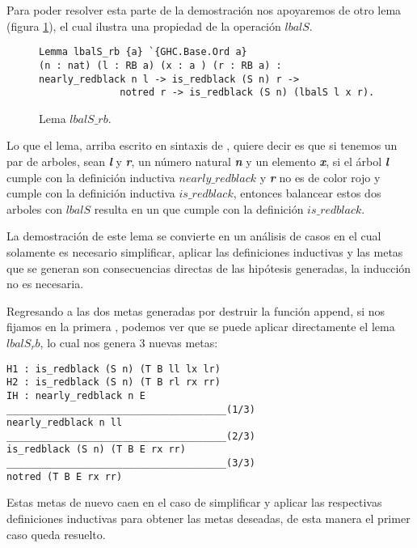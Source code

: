 Para poder resolver esta parte de la demostraci\'on nos apoyaremos de otro lema (figura
\ref{lema_5}), el cual ilustra una propiedad de la operaci\'on \hyperref[lbalS]{$lbalS$}.

\begin{figure}[!ht]
\centering
\captionsetup{justification=centering}
\begin{verbatim}
Lemma lbalS_rb {a} `{GHC.Base.Ord a}
(n : nat) (l : RB a) (x : a ) (r : RB a) :
nearly_redblack n l -> is_redblack (S n) r ->
              notred r -> is_redblack (S n) (lbalS l x r).
\end{verbatim}
\caption{Lema $lbalS\_rb$.}
\label{lema_5}
\end{figure}


Lo que el lema, arriba escrito en sintaxis de {\coq}, quiere decir es que si tenemos un par de
arboles, sean \textbf{\textit{l}} y \textbf{\textit{r}}, un n\'umero natural \textbf{\textit{n}} y un elemento \textbf{\textit{x}}, si el \'arbol \textbf{\textit{l}} cumple con la
definici\'on inductiva \hyperref[inductive_isRedB]{$nearly\_redblack$} y \textbf{\textit{r}} no es de color rojo y 
cumple con la definici\'on inductiva \hyperref[inductive_isRedB]{$is\_redblack$}, entonces balancear 
estos dos arboles con \hyperref[lbalS]{$lbalS$} resulta en un {\arn} que cumple con la definici\'on 
$is\_redblack$.

La demostraci\'on de este lema se convierte en un análisis de casos en el cual solamente es
necesario simplificar, aplicar las definiciones inductivas y las metas que se generan son
consecuencias directas de las hipótesis generadas, la inducci\'on no es necesaria.

Regresando a las dos metas generadas por destruir la funci\'on append, si nos fijamos en la primera
, podemos ver que se puede aplicar directamente el lema $lbalS_rb$, lo cual nos genera 3 nuevas 
metas:

\begin{verbatim}
H1 : is_redblack (S n) (T B ll lx lr)
H2 : is_redblack (S n) (T B rl rx rr)
IH : nearly_redblack n E
______________________________________(1/3)
nearly_redblack n ll
______________________________________(2/3)
is_redblack (S n) (T B E rx rr)
______________________________________(3/3)
notred (T B E rx rr)
\end{verbatim}

Estas metas de nuevo caen en el caso de simplificar y aplicar las respectivas definiciones
inductivas para obtener las metas deseadas, de esta manera el primer caso queda resuelto.

